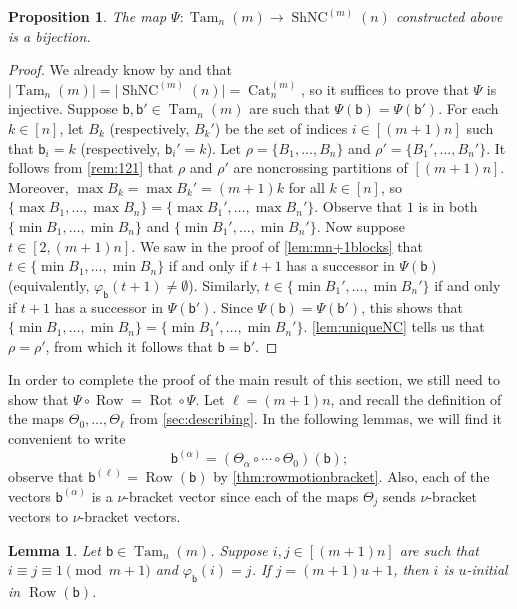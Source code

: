 \documentclass[11pt]{amsart}
\newtheorem{proposition}[theorem]{Proposition}
\newtheorem{lemma}[theorem]{Lemma}
\theoremstyle{definition}
\DeclareMathOperator{\ShNC}{ShNC}
\DeclareMathOperator{\Tam}{Tam}
\DeclareMathOperator{\row}{Row}
\DeclareMathOperator{\Rot}{Rot}
\DeclareMathOperator{\Cat}{Cat}
\begin{document}
\begin{proposition}\label{prop:Psibijection}
The map $\Psi\colon\Tam_n(m)\to\ShNC^{(m)}(n)$ constructed above is a bijection.     
\end{proposition}

\begin{proof}
We already know by \cite[Section~4.3]{Armstrong} and \cite{Dvoretzky} that $\lvert\Tam_n(m)\rvert=\lvert\ShNC^{(m)}(n)\rvert=\Cat^{(m)}_n$, so it suffices to prove that $\Psi$ is injective. Suppose $\mathsf b,\mathsf b'\in\Tam_n(m)$ are such that $\Psi(\mathsf b)=\Psi(\mathsf b')$. For each $k\in[n]$, let $B_k$ (respectively, $B_k'$) be the set of indices $i\in[(m+1)n]$ such that $\mathsf b_i=k$ (respectively, $\mathsf b_i'=k$). Let $\rho=\{B_1,\ldots,B_n\}$ and $\rho'=\{B_1',\ldots,B_n'\}$. It follows from \cref{rem:121} that $\rho$ and $\rho'$ are noncrossing partitions of $[(m+1)n]$. Moreover, $\max B_k=\max B_k'=(m+1)k$ for all $k\in[n]$, so $\{\max B_1,\ldots,\max B_n\}=\{\max B_1',\ldots,\max B_n'\}$. Observe that $1$ is in both $\{\min B_1,\ldots,\min B_n\}$ and $\{\min B_1',\ldots,\min B_n'\}$. Now suppose $t\in[2,(m+1)n]$. We saw in the proof of \cref{lem:mn+1blocks} that $t\in\{\min B_1,\ldots,\min B_n\}$ if and only if $t+1$ has a successor in $\Psi(\mathsf b)$ (equivalently, $\varphi_{\mathsf b}(t+1)\neq\emptyset$). Similarly, $t\in\{\min B_1',\ldots,\min B_n'\}$ if and only if $t+1$ has a successor in $\Psi(\mathsf b')$. Since $\Psi(\mathsf b)=\Psi(\mathsf b')$, this shows that $\{\min B_1,\ldots,\min B_n\}=\{\min B_1',\ldots,\min B_n'\}$. \cref{lem:uniqueNC} tells us that $\rho=\rho'$, from which it follows that $\mathsf b=\mathsf b'$. 
\end{proof}

In order to complete the proof of the main result of this section, we still need to show that ${\Psi\circ\row=\Rot\circ\Psi}$. Let $\ell=(m+1)n$, and recall the definition of the maps $\Theta_0,\ldots,\Theta_\ell$ from \cref{sec:describing}. In the following lemmas, we will find it convenient to write \[\mathsf b^{(\alpha)}=(\Theta_{\alpha}\circ\cdots\circ\Theta_0)(\mathsf b);\] observe that $\mathsf b^{(\ell)}=\row(\mathsf b)$ by \cref{thm:rowmotionbracket}. Also, each of the vectors $\mathsf b^{(\alpha)}$ is a $\nu$-bracket vector since each of the maps $\Theta_j$ sends $\nu$-bracket vectors to $\nu$-bracket vectors.

\begin{lemma}\label{lem:1modm+1}
Let $\mathsf b\in\Tam_n(m)$. Suppose $i,j\in[(m+1)n]$ are such that $i\equiv j\equiv 1\pmod{m+1}$ and $\varphi_{\mathsf b}(i)=j$. If $j=(m+1)u+1$, then $i$ is $u$-initial in $\row(\mathsf b)$. 
\end{lemma}
\end{document}

